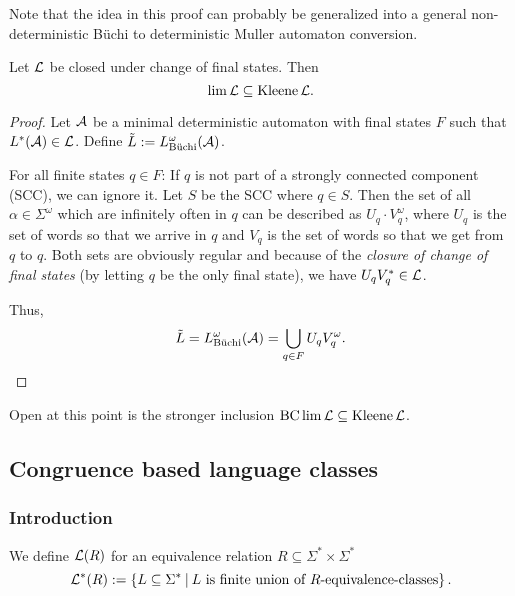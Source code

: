 Note that the idea in this proof can probably be generalized into a general non-deterministic Büchi to deterministic Muller automaton conversion.

\begin{lemma}
Let $\mathcal{L}$ be closed under change of final states. Then
\[ \lim \mathcal{L} \subseteq \operatorname{Kleene} \mathcal{L} . \]
\begin{proof}
Let $\mathcal{A}$ be a minimal deterministic automaton with final states $F$ such that $L^*(\mathcal{A}) \in \mathcal{L}$. Define $\tilde L := L^\omega_{\text{Büchi}}(\mathcal{A})$.

For all finite states $q \in F$: If $q$ is not part of a strongly connected component (SCC), we can ignore it. Let $S$ be the SCC where $q \in S$. Then the set of all $\alpha \in \Sigma^\omega$ which are infinitely often in $q$ can be described as $U_q \cdot V_q^\omega$, where $U_q$ is the set of words so that we arrive in $q$ and $V_q$ is the set of words so that we get from $q$ to $q$. Both sets are obviously regular and because of the \emph{closure of change of final states} (by letting $q$ be the only final state), we have $U_q V_q^* \in \mathcal{L}$.

Thus,
\[ \tilde L = L^\omega_{\text{Büchi}}(\mathcal{A}) = \bigcup_{q \in F} U_q V_q^\omega . \]
%
%
\end{proof}
\end{lemma}

Open at this point is the stronger inclusion $\operatorname{BC} \lim \mathcal{L} \subseteq \operatorname{Kleene} \mathcal{L}$.

\subsection{Congruence based language classes}
\label{gen:R}

\subsubsection{Introduction}
\label{gen:R-automata}

\begin{mydef}
We define $\mathcal{L}(R)$ for an equivalence relation $R\subseteq\Sigma^* \times \Sigma^*$
\[ \Lang^*(R) := \Set{L \subseteq \Sigma^*}{L \text{ is finite union of $R$-equivalence-classes}} . \]
\end{mydef}

